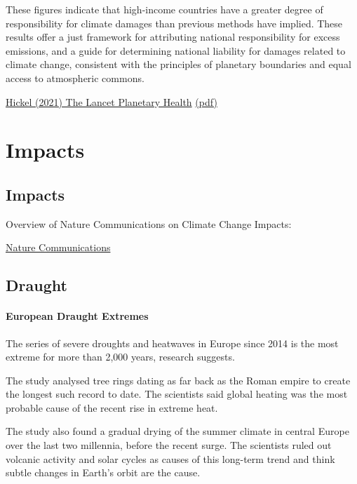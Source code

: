 \documentclass[
]{book}
\begin{document}
These figures indicate that high-income countries have a greater degree of responsibility for climate
damages than previous methods have implied. These results offer a just framework for attributing national
responsibility for excess emissions, and a guide for determining national liability for damages related to climate
change, consistent with the principles of planetary boundaries and equal access to atmospheric commons.

\href{https://www.thelancet.com/journals/lanplh/article/PIIS2542-5196(20)30196-0/fulltext}{Hickel (2021) The Lancet Planetary Health}
\href{pdf/Hickel_2021_Fair_Shares.pdf}{(pdf)}

\hypertarget{part-impacts}{%
\part{Impacts}\label{part-impacts}}

\hypertarget{impacts}{%
\chapter{Impacts}\label{impacts}}

Overview of Nature Communications on Climate Change Impacts:

\href{https://www.nature.com/collections/hcfhgcahdc}{Nature Communications}

\hypertarget{draught}{%
\chapter{Draught}\label{draught}}

\hypertarget{european-draught-extremes}{%
\subsection{European Draught Extremes}\label{european-draught-extremes}}

The series of severe droughts and heatwaves in Europe since 2014 is the most extreme for more than 2,000 years, research suggests.

The study analysed tree rings dating as far back as the Roman empire to create the longest such record to date. The scientists said global heating was the most probable cause of the recent rise in extreme heat.

The study also found a gradual drying of the summer climate in central Europe over the last two millennia, before the recent surge. The scientists ruled out volcanic activity and solar cycles as causes of this long-term trend and think subtle changes in Earth's orbit are the cause.
\end{document}

